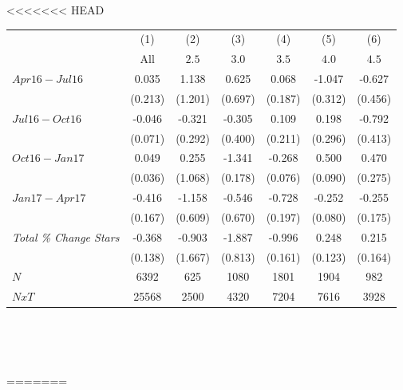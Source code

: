 <<<<<<< HEAD
\begin{center}
\begin{tabular}{lcccccc}
\hline  & (1) & (2) & (3) & (4) & (5) & (6)\\
 & All &  $ 2.5 $  &  $ 3.0 $  &  $ 3.5 $  &  $ 4.0 $  &  $ 4.5$ \\
\hline  $ Apr16-Jul16 $  & 0.035 & 1.138 & 0.625 & 0.068 & -1.047 & -0.627\\
 & (0.213) & (1.201) & (0.697) & (0.187) & (0.312) & (0.456)\\
 $ Jul16-Oct16 $  & -0.046 & -0.321 & -0.305 & 0.109 & 0.198 & -0.792\\
 & (0.071) & (0.292) & (0.400) & (0.211) & (0.296) & (0.413)\\
 $ Oct16-Jan17 $  & 0.049 & 0.255 & -1.341 & -0.268 & 0.500 & 0.470\\
 & (0.036) & (1.068) & (0.178) & (0.076) & (0.090) & (0.275)\\
 $ Jan17-Apr17 $  & -0.416 & -1.158 & -0.546 & -0.728 & -0.252 & -0.255\\
 & (0.167) & (0.609) & (0.670) & (0.197) & (0.080) & (0.175)\\
\hline \textit{Total \% Change Stars} & -0.368 & -0.903 & -1.887 & -0.996 & 0.248 & 0.215\\
  & (0.138) & (1.667) & (0.813) & (0.161) & (0.123) & (0.164)\\
\hline  $ N $  & 6392 & 625 & 1080 & 1801 & 1904 & 982\\
 $ NxT $  & 25568 & 2500 & 4320 & 7204 & 7616 & 3928\\
\hline\end{tabular}\\
\begin{tiny} \hfil\end{tiny}\\
\end{center}
=======
